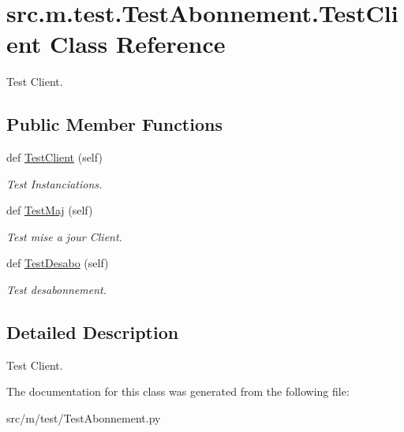 \hypertarget{classsrc_1_1m_1_1test_1_1_test_abonnement_1_1_test_client}{}\section{src.\+m.\+test.\+Test\+Abonnement.\+Test\+Client Class Reference}
\label{classsrc_1_1m_1_1test_1_1_test_abonnement_1_1_test_client}


Test Client.  


\subsection*{Public Member Functions}
\begin{DoxyCompactItemize}
\item 
\hypertarget{classsrc_1_1m_1_1test_1_1_test_abonnement_1_1_test_client_ada9343de262a928a0fbca088d0b340ac}{}def \hyperlink{classsrc_1_1m_1_1test_1_1_test_abonnement_1_1_test_client_ada9343de262a928a0fbca088d0b340ac}{Test\+Client} (self)\label{classsrc_1_1m_1_1test_1_1_test_abonnement_1_1_test_client_ada9343de262a928a0fbca088d0b340ac}

\begin{DoxyCompactList}\small\item\em Test Instanciations. \end{DoxyCompactList}\item 
\hypertarget{classsrc_1_1m_1_1test_1_1_test_abonnement_1_1_test_client_a06769ea71ddaded1894abd43d10de9a9}{}def \hyperlink{classsrc_1_1m_1_1test_1_1_test_abonnement_1_1_test_client_a06769ea71ddaded1894abd43d10de9a9}{Test\+Maj} (self)\label{classsrc_1_1m_1_1test_1_1_test_abonnement_1_1_test_client_a06769ea71ddaded1894abd43d10de9a9}

\begin{DoxyCompactList}\small\item\em Test mise a jour Client. \end{DoxyCompactList}\item 
\hypertarget{classsrc_1_1m_1_1test_1_1_test_abonnement_1_1_test_client_aa681e513e99c005d490f123b859462b7}{}def \hyperlink{classsrc_1_1m_1_1test_1_1_test_abonnement_1_1_test_client_aa681e513e99c005d490f123b859462b7}{Test\+Desabo} (self)\label{classsrc_1_1m_1_1test_1_1_test_abonnement_1_1_test_client_aa681e513e99c005d490f123b859462b7}

\begin{DoxyCompactList}\small\item\em Test desabonnement. \end{DoxyCompactList}\end{DoxyCompactItemize}


\subsection{Detailed Description}
Test Client. 

The documentation for this class was generated from the following file\+:\begin{DoxyCompactItemize}
\item 
src/m/test/Test\+Abonnement.\+py\end{DoxyCompactItemize}
